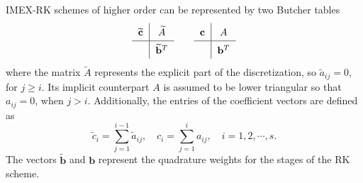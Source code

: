 \documentclass[onefignum,onetabnum]{siamart220329}
\begin{document}
IMEX-RK schemes of higher order can be represented by two Butcher tables \cite{ascher1997implicit}
\begin{equation}
    \label{eq:IMEX double tableau}
    \def\arraystretch{1.5}
    \begin{tabular}{c|c}
        $\widetilde{\mathbf{c}}$ & $\widetilde{A}$ \\
        \hline
                               & $\widetilde{\mathbf{b}}^{T}$
    \end{tabular}
    \quad\quad
    \def\arraystretch{1.5}
    \begin{tabular}{c|c}
        $\mathbf{c}$ & $A$ \\
        \hline
                               & $\mathbf{b}^{T}$
    \end{tabular}
\end{equation}
where the matrix $\widetilde{A}$ represents the explicit part of the discretization, so $\widetilde{a}_{ij} = 0$, for $j \geq i$. Its implicit counterpart $A$ is assumed to be lower triangular so that $a_{ij} = 0$, when $j > i$. Additionally, the entries of the coefficient vectors are defined as
\begin{equation*}
    \widetilde{c}_{i} = \sum_{j=1}^{i-1} \widetilde{a}_{ij}, \quad c_{i} = \sum_{j=1}^{i} a_{ij}, \quad i = 1, 2, \cdots, s.
\end{equation*}
The vectors $\widetilde{\mathbf{b}}$ and $\mathbf{b}$ represent the quadrature weights for the stages of the RK scheme.
\end{document}
